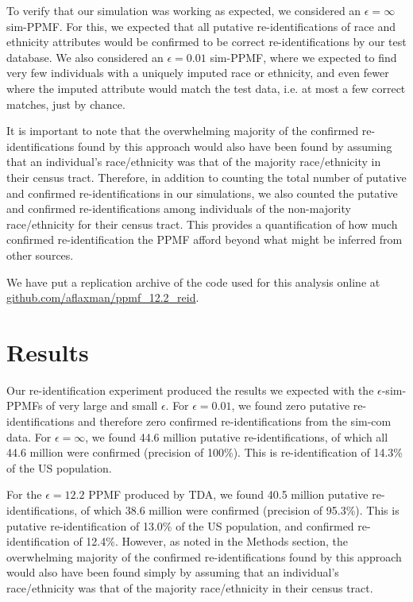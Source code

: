 \documentclass{article}
\begin{document}
To verify that our simulation was working as expected, we considered an $\epsilon=\infty$ sim-PPMF. For this, we expected that all putative re-identifications of race and ethnicity attributes would be confirmed to be correct re-identifications by our test database. We also considered an $\epsilon=0.01$ sim-PPMF, where we expected to find very few individuals with a uniquely imputed race or ethnicity, and even fewer where the imputed attribute would match the test data, i.e. at most a few correct matches, just by chance.

It is important to note that the overwhelming majority of the confirmed re-identifications found by this approach would also have been found by assuming that an individual's race/ethnicity was that of the majority race/ethnicity in their census tract.  Therefore, in addition to counting the total number of putative and confirmed re-identifications in our simulations, we also counted the putative and confirmed re-identifications among individuals of the non-majority race/ethnicity for their census tract.  This provides a quantification of how much confirmed re-identification the PPMF afford beyond what might be inferred from other sources.

We have put a replication archive of the code used for this analysis online at \href{https://github.com/aflaxman/ppmf_12.2_reid}{github.com/aflaxman/ppmf\_12.2\_reid}.

\section{Results}

Our re-identification experiment produced the results we expected with the $\epsilon$-sim-PPMFs of very large and small $\epsilon$.  For $\epsilon=0.01$, we found zero putative re-identifications and therefore zero confirmed re-identifications from the sim-com data.  For $\epsilon=\infty$, we found 44.6 million putative re-identifications, of which all 44.6 million were confirmed (precision of 100\%).  This is re-identification of 14.3\% of the US population.

For the $\epsilon=12.2$ PPMF produced by TDA, we found 40.5 million putative re-identifications, of which 38.6 million were confirmed (precision of 95.3\%). This is putative re-identification of 13.0\% of the US population, and confirmed re-identification of 12.4\%.
However, as noted in the Methods section, the overwhelming majority of the confirmed re-identifications found by this approach would also have been found simply by assuming that an individual's race/ethnicity was that of the majority race/ethnicity in their census tract. 
\end{document}
